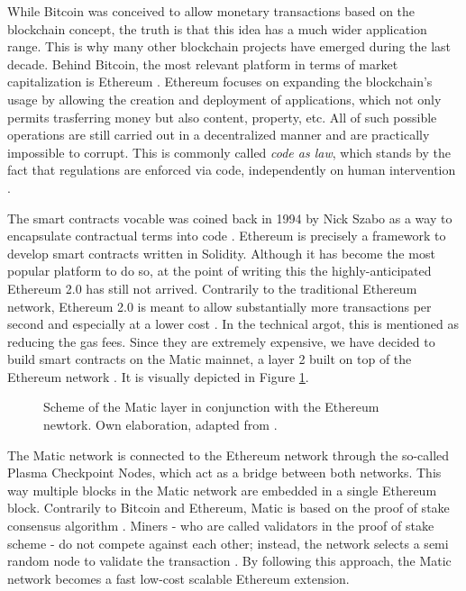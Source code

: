 While Bitcoin was conceived to allow monetary transactions based on the blockchain concept, the truth is that this idea has a much wider application range. This is why many other blockchain projects have emerged during the last decade. Behind Bitcoin, the most relevant platform in terms of market capitalization is Ethereum \cite{ethereum_market}. Ethereum focuses on expanding the blockchain's usage by allowing the creation and deployment of applications, which not only permits trasferring money but also content, property, etc. All of such possible operations are still carried out in a decentralized manner and are practically impossible to corrupt. This is commonly called \textit{code as law}, which stands by the fact that regulations are enforced via code, independently on human intervention \cite{lessig2000code}. 


The smart contracts vocable was coined back in 1994 by Nick Szabo as a way to encapsulate contractual terms into code \cite{szabo1994smart, christidis2016blockchains}. Ethereum is precisely a framework to develop smart contracts written in Solidity. Although it has become the most popular platform to do so, at the point of writing this the highly-anticipated Ethereum 2.0 has still not arrived. Contrarily to the traditional Ethereum network, Ethereum 2.0 is meant to allow substantially more transactions per second and especially at a lower cost \cite{eth2}. In the technical argot, this is mentioned as reducing the gas fees. Since they are extremely expensive, we have decided to build smart contracts on the Matic mainnet, a layer 2 built on top of the Ethereum network \cite{matic_web}. It is visually depicted in Figure \ref{fig:block2}.

\begin{figure}[!htb]\centering
    \caption{Scheme of the Matic layer in conjunction with the Ethereum newtork. Own elaboration, adapted from \cite{matic_web}.}
    \label{fig:block2}
\end{figure}
The Matic network is connected to the Ethereum network through the so-called Plasma Checkpoint Nodes, which act as a bridge between both networks. This way multiple blocks in the Matic network are embedded in a single Ethereum block. Contrarily to Bitcoin and Ethereum, Matic is based on the proof of stake consensus algorithm \cite{matic_web}. Miners - who are called validators in the proof of stake scheme - do not compete against each other; instead, the network selects a semi random node to validate the transaction \cite{saleh2021blockchain, gavzi2019proof}. By following this approach, the Matic network becomes a fast low-cost scalable Ethereum extension. 

